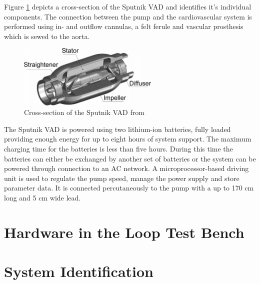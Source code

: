 Figure \ref{fig:sput_cross} depicts a cross-section of the Sputnik VAD and identifies it's individual components.
The connection between the pump and the cardiovascular system is performed using in- and outflow cannulas, a felt ferule and vascular prosthesis which is sewed to the aorta. \cite{Sputnik1}
\begin{figure}[h]
  \centering
  \includegraphics[width=0.6\textwidth]{images/sputnik_cross.png}
  \caption{Cross-section of the Sputnik VAD from \cite{Sputnik6}}
  \label{fig:sput_cross}
\end{figure}
The Sputnik VAD is powered using two lithium-ion batteries, fully loaded providing enough energy for up to eight hours of system support. The maximum charging time for the batteries is less than five hours. During this time the batteries can either be exchanged by another set of batteries or the system can be powered through connection to an AC network. A microprocessor-based driving unit is used to regulate the pump speed, manage the power supply and store parameter data. It is connected percutaneously to the pump with a up to 170 cm long and 5 cm wide lead. \cite{Sputnik1}

\section{Hardware in the Loop Test Bench}

\section{System Identification}
